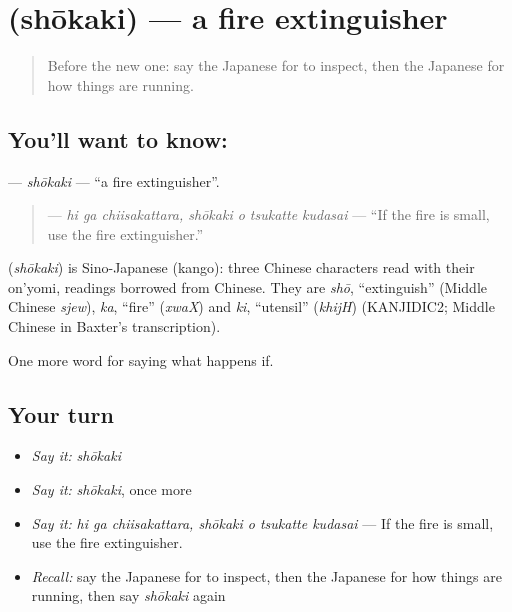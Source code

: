 \section[\texorpdfstring{\ja{しょうかき} (shōkaki)}{しょうかき (shōkaki)}]{ (shōkaki) — a fire extinguisher}

\label{lesson:JA-C353-shoukaki}



\begin{quote}
Before the new one: say the Japanese for to inspect, then the Japanese for how things are running.
\end{quote}

\subsection*{You'll want to know: }
\textbf{} — \emph{shōkaki} — \textquotedblleft{}a fire extinguisher\textquotedblright{}.

\begin{quote}
\textbf{   } — \emph{hi ga chiisakattara, shōkaki o tsukatte kudasai} — \textquotedblleft{}If the fire is small, use the fire extinguisher.\textquotedblright{}
\end{quote}

\begin{cousinweb}
\textbf{} (\emph{shōkaki}) is Sino-Japanese (kango): three Chinese characters read with their on'yomi, readings borrowed from Chinese. They are \emph{shō}, \textquotedblleft{}extinguish\textquotedblright{} (Middle Chinese \emph{sjew}), \emph{ka}, \textquotedblleft{}fire\textquotedblright{} (\emph{xwaX}) and \emph{ki}, \textquotedblleft{}utensil\textquotedblright{} (\emph{khijH}) (KANJIDIC2; Middle Chinese in Baxter's transcription).
\end{cousinweb}

\begin{grammarlens}[title={What you've built}]
One more word for saying what happens if.
\end{grammarlens}

\subsection*{Your turn}
\begin{itemize}
\raggedright
  \item \emph{Say it:} \emph{shōkaki}
  \item \emph{Say it:} \emph{shōkaki}, once more
  \item \emph{Say it:} \emph{hi ga chiisakattara, shōkaki o tsukatte kudasai} — If the fire is small, use the fire extinguisher.
  \item \emph{Recall:} say the Japanese for to inspect, then the Japanese for how things are running, then say \emph{shōkaki} again
\end{itemize}

